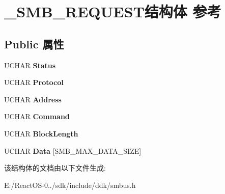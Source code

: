 \hypertarget{struct___s_m_b___r_e_q_u_e_s_t}{}\section{\+\_\+\+S\+M\+B\+\_\+\+R\+E\+Q\+U\+E\+S\+T结构体 参考}
\label{struct___s_m_b___r_e_q_u_e_s_t}
\subsection*{Public 属性}
\begin{DoxyCompactItemize}
\item 
\mbox{\label{struct___s_m_b___r_e_q_u_e_s_t_aa0e077eb1e785aa77fc888f7b89a9640}} 
U\+C\+H\+AR {\bfseries Status}
\item 
\mbox{\label{struct___s_m_b___r_e_q_u_e_s_t_a713722471786aee48fcc31a1b67dd391}} 
U\+C\+H\+AR {\bfseries Protocol}
\item 
\mbox{\label{struct___s_m_b___r_e_q_u_e_s_t_a025970100716940343c696bd47d42601}} 
U\+C\+H\+AR {\bfseries Address}
\item 
\mbox{\label{struct___s_m_b___r_e_q_u_e_s_t_a2cca917bc94eabdaf286988e3ef65b75}} 
U\+C\+H\+AR {\bfseries Command}
\item 
\mbox{\label{struct___s_m_b___r_e_q_u_e_s_t_a83cd36427791cbb9063487b69176744f}} 
U\+C\+H\+AR {\bfseries Block\+Length}
\item 
\mbox{\label{struct___s_m_b___r_e_q_u_e_s_t_af5f771dd0442089c76a81c8d446d52b2}} 
U\+C\+H\+AR {\bfseries Data} \mbox{[}S\+M\+B\+\_\+\+M\+A\+X\+\_\+\+D\+A\+T\+A\+\_\+\+S\+I\+ZE\mbox{]}
\end{DoxyCompactItemize}


该结构体的文档由以下文件生成\+:\begin{DoxyCompactItemize}
\item 
E\+:/\+React\+O\+S-\/0../sdk/include/ddk/smbus.\+h\end{DoxyCompactItemize}
